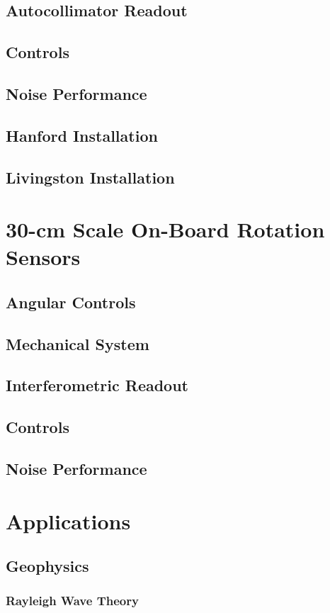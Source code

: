 \documentclass [12pt, proquest]{uwthesis}[2019]
\begin{document}
\section{Autocollimator Readout}
\section{Controls}
\section{Noise Performance}
\section{Hanford Installation}
\section{Livingston Installation}

\chapter{30-cm Scale On-Board Rotation Sensors}
\section{Angular Controls}
\section{Mechanical System}
\section{Interferometric Readout}
\section{Controls}
\section{Noise Performance}

\chapter{Applications}
\section{Geophysics}
\subsection{Rayleigh Wave Theory}
\end{document}
